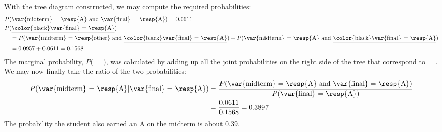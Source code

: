 \begin{examplewrap}
\begin{nexample}
With the tree diagram constructed, we may compute the required probabilities:
\begin{align*}
&P(\text{\var{midterm} = \resp{A} and \var{final} = \resp{A}}) = 0.0611 \\
&P(\text{\underline{\color{black}\var{final} = \resp{A}}})  \\
& \quad= P(\text{\var{midterm} = \resp{other} and \underline{\color{black}\var{final} = \resp{A}}}) + P(\text{\var{midterm} = \resp{A} and \underline{\color{black}\var{final} = \resp{A}}}) \\
& \quad= 0.0957 + 0.0611  = 0.1568
\end{align*}
The marginal probability, $P($ = $)$, was calculated by adding up all the joint probabilities on the right side of the tree that correspond to  = . We may now finally take the ratio of the two probabilities:
\begin{align*}
P(\text{\var{midterm} = \resp{A}} | \text{\var{final} = \resp{A}})
  &= \frac{P(\text{\var{midterm} = \resp{A}
      and \var{final} = \resp{A}})}
    {P(\text{\var{final} = \resp{A}})} \\
  &= \frac{0.0611}{0.1568} = 0.3897
\end{align*}
The probability the student also earned an A on the midterm is about 0.39.
\end{nexample}
\end{examplewrap}



